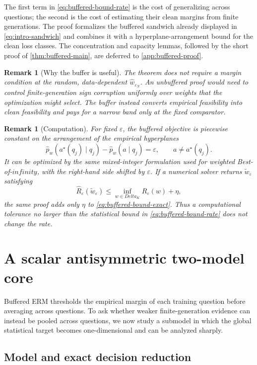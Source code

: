 \documentclass[11pt]{article}
\def\infty{infinity}%
\def\Delta{Delta}%
\newtheorem{remark}[theorem]{Remark}
\newcommand{\eps}{\varepsilon}
\begin{document}
The first term in \eqref{eq:buffered-bound-rate} is the cost of generalizing across questions; the second is the cost of estimating their clean margins from finite generations.  The proof formalizes the buffered sandwich already displayed in \eqref{eq:intro-sandwich} and combines it with a hyperplane-arrangement bound for the clean loss classes.  The concentration and capacity lemmas, followed by the short proof of \cref{thm:buffered-main}, are deferred to \cref{app:buffered-proof}.

\begin{remark}[Why the buffer is useful]
The theorem does not require a margin condition at the random, data-dependent $\widehat w_{\eps_N}$.  An unbuffered proof would need to control finite-generation sign corruption uniformly over weights that the optimization might select.  The buffer instead converts empirical feasibility into clean feasibility and pays for a narrow band only at the fixed comparator.
\end{remark}

\begin{remark}[Computation]
For fixed $\eps$, the buffered objective is piecewise constant on the arrangement of the empirical hyperplanes
\[
\widehat p_w(a^\star(q_j)\mid q_j)
-\widehat p_w(a\mid q_j)
=\eps,
\qquad a\ne a^\star(q_j).
\]
It can be optimized by the same mixed-integer formulation used for weighted Best-of-$\infty$, with the right-hand side shifted by $\eps$.  If a numerical solver returns $\widetilde w_\eps$ satisfying
\[
\widehat R_\eps(\widetilde w_\eps)
\le
\inf_{w\in\Delta_K}\widehat R_\eps(w)+\eta,
\]
the same proof adds only $\eta$ to \eqref{eq:buffered-bound-exact}.  Thus a computational tolerance no larger than the statistical bound in \eqref{eq:buffered-bound-rate} does not change the rate.
\end{remark}

\section{A scalar antisymmetric two-model core}
\label{sec:scalar-model}

Buffered ERM thresholds the empirical margin of each training question before averaging across questions.  To ask whether weaker finite-generation evidence can instead be pooled across questions, we now study a submodel in which the global statistical target becomes one-dimensional and can be analyzed sharply.

\subsection{Model and exact decision reduction}
\end{document}
